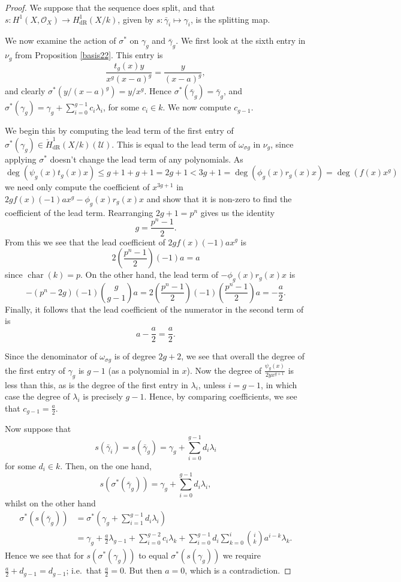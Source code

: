 \documentclass[draft, 11pt]{article} %
\theoremstyle{plain}
\theoremstyle{remark}
\newcommand{\ra}{\rightarrow}
\newcommand{\cU}{{\mathcal U}}
\newcommand{\hone}{H^1(X,\mathcal{O}_X)}
\newcommand{\derhamhone}{H_{\text {dR}}^1(X/k)}
\newcommand{\cechderhamhone}{\check{H}_{\text {dR}}^1(X/k)}
\newcommand{\ie}{i.e.\ }
\DeclareMathOperator{\cha}{char}
\begin{document}
\begin{proof}
We suppose that the sequence does split, and that $s \colon \hone \ra \derhamhone$, given by $s \colon \bar\gamma_i \mapsto \gamma_i$, is the splitting map.

We now examine the action of $\sigma^*$ on $\gamma_g$ and $\bar \gamma_g$.
We first look at the sixth entry in $\nu_g$ from Proposition \ref{basis22}.
This entry is
\[
\frac{t_g(x)y}{x^g(x-a)^g} = \frac{y}{(x-a)^g},
\]
and clearly $\sigma^*(y/(x-a)^g) = y/x^g$.
Hence $\sigma^*(\bar\gamma_g) = \bar \gamma_g$, and $\sigma^*(\gamma_g) = \gamma_g + \sum_{i =0}^{g-1}c_i\lambda_i$, for some $c_i \in k$.
We now compute $c_{g-1}$.

We begin this by computing the lead term of the first entry of $\sigma^*(\gamma_g) \in \cechderhamhone(\cU)$.
This is equal to the lead term of $\omega_{\sigma g}$ in $\nu_g$, since applying $\sigma^*$ doesn't change the lead term of any polynomials.
As
\[
\deg(\psi_g(x)t_g(x)x) \leq g+1 + g+ 1 = 2g+1 < 3g+1 = \deg(\phi_g(x)r_g(x)x) = \deg(f(x)x^g)
\]
we need only compute the coefficient of $x^{3g+1}$ in $2gf(x)(-1)ax^g - \phi_g(x)r_g(x)x$ and show that it is non-zero to find the coefficient of the lead term.
Rearranging $2g+1 = p^n $ gives us the identity
\[
g = \frac{p^n - 1}{2}.
\]
From this we see that the lead coefficient of $2gf(x)(-1)ax^g$ is 
\[
2\left( \frac{p^n-1}{2} \right) (-1)a = a
\]
since $\cha(k) = p$.
On the other hand, the lead term of $-\phi_g(x)r_g(x)x$ is
\[
-(p^n-2g)(-1)\binom{g}{g-1}a = 2\left(\frac{p^n -1 }{2}\right) (-1)\left( \frac{p^n - 1}{2} \right)a = -\frac{a}{2}.
\]
Finally, it follows that the lead coefficient of the numerator in the second term of is
\[
a - \frac{a}{2} = \frac{a}{2}.
\]


Since the denominator of $\omega_{\sigma g}$ is of degree $2g+2$, we see that overall the degree of the first entry of $\gamma_g$ is $g-1$ (as a polynomial in $x$).
Now the degree of $\frac{\psi_g(x)}{2yx^{g+1}}$ is less than this, as is the degree of the first entry in $\lambda_i$, unless $i=g-1$, in which case the degree of $\lambda_i$ is precisely $g-1$.
Hence, by comparing coefficients, we see that $c_{g-1} = \frac{a}{2}$.

Now suppose that 
\[
s(\bar\gamma_i)  = s( \bar \gamma_g) = \gamma_g + \sum_{i=0}^{g-1}d_i \lambda_i
\]
for some $d_i \in k$.
Then, on the one hand,
\[
s(\sigma^*(\bar\gamma_g)) = \gamma_g + \sum_{i=0}^{g-1}d_i\lambda_i,
\]
whilst on the other hand
\begin{align}
\sigma^*(s(\bar\gamma_g)) & = \sigma^*(\gamma_g + \sum_{i=1}^{g-1} d_i\lambda_i ) \\
& = \gamma_g + \frac{a}{2}\lambda_{g-1} + \sum_{i=0}^{g-2} c_i \lambda_k + \sum_{i=0}^{g-1} d_i \sum_{k=0}^{i} \binom{i}{k}a^{i-k}\lambda_k.
\end{align}
Hence we see that for $s(\sigma^*(\gamma_g))$ to equal $\sigma^*(s(\gamma_g))$ we require $\frac{a}{2} + d_{g-1} = d_{g-1}$; \ie that $\frac{a}{2} = 0$. 
But then $a=0$, which is a contradiction.

\end{proof}
\end{document}
